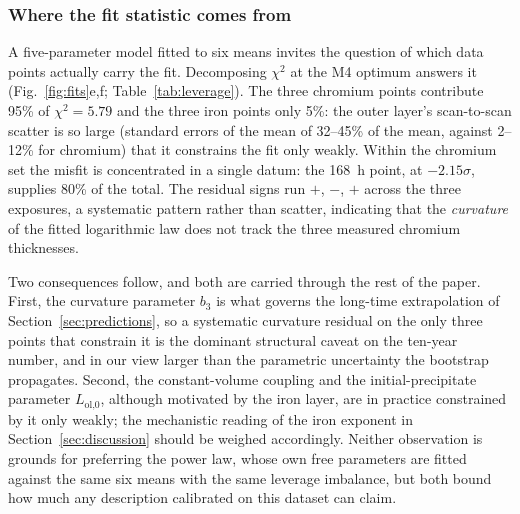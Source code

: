 \documentclass[a4paper,fleqn]{cas-sc}
\begin{document}
\subsubsection*{Where the fit statistic comes from}

A five-parameter model fitted to six means invites the question of which
data points actually carry the fit. Decomposing $\chi^2$ at the M4
optimum answers it (Fig.~\ref{fig:fits}e,f;
Table~\ref{tab:leverage}). The three chromium points contribute 95\% of
$\chi^2 = 5.79$ and the three iron points only 5\%: the outer layer's
scan-to-scan scatter is so large (standard errors of the mean of 32--45\%
of the mean, against 2--12\% for chromium) that it constrains the fit
only weakly. Within the chromium set the misfit is concentrated in a
single datum: the 168~h point, at $-2.15\sigma$, supplies 80\% of the
total. The residual signs run $+$, $-$, $+$ across the three
exposures, a systematic pattern rather than scatter, indicating that the
\emph{curvature} of the fitted logarithmic law does not track the three
measured chromium thicknesses.

Two consequences follow, and both are carried through the rest of the
paper. First, the curvature parameter $b_3$ is what governs the long-time
extrapolation of Section~\ref{sec:predictions}, so a systematic curvature
residual on the only three points that constrain it is the dominant
structural caveat on the ten-year number, and in our view larger than the
parametric uncertainty the bootstrap propagates. Second, the
constant-volume coupling and the initial-precipitate parameter
$L_\text{ol,0}$, although motivated by the iron layer, are in practice
constrained by it only weakly; the mechanistic reading of the iron
exponent in Section~\ref{sec:discussion} should be weighed accordingly.
Neither observation is grounds for preferring the power law, whose own
free parameters are fitted against the same six means with the same
leverage imbalance, but both bound how much any description calibrated on
this dataset can claim.
\end{document}
